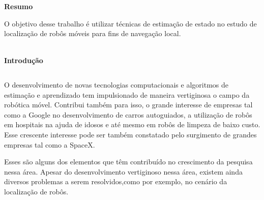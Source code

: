 \documentclass[a0,portrait]{a0poster}
\begin{document}
\begin{multicols}{1} %

\begin{center}
\color{Navy} %
\LARGE
\textbf{Resumo}
\end{center}

\LARGE O objetivo desse trabalho é utilizar técnicas de estimação de estado  no estudo de localização de robôs móveis para fins de navegação local.\\\\




\color{SaddleBrown} %
\begin{flushleft}
\textbf{Introdução} 
\end{flushleft}
$$$$
\LARGE
\par O desenvolvimento de novas tecnologias computacionais e algoritmos de estimação e aprendizado tem impulsionado de maneira vertiginosa o campo da robótica móvel. Contribui também para isso, o grande interesse de empresas tal como a Google no desenvolvimento de carros autoguiados, a utilização de robôs em hospitais na ajuda de idosos e  até mesmo em robôs de limpeza de baixo custo. Esse crescente interesse pode ser também constatado pelo surgimento de grandes empresas tal como a SpaceX.\par 

  Esses são alguns dos elementos que têm contribuído no crescimento da pesquisa nessa área. Apesar do desenvolvimento vertiginoso nessa área, existem ainda diversos problemas a serem resolvidos,como por exemplo, no cenário da localização de robôs.\\






\end{multicols}
\end{document}
